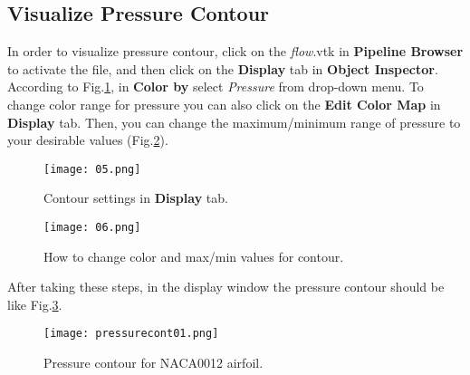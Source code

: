 \subsection{Visualize Pressure Contour}
In order to visualize pressure contour, click on the \textit{flow}.vtk in \textbf{Pipeline Browser} to activate the file, and then click on the \textbf{Display} tab in \textbf{Object Inspector}. According to Fig.\ref{fig:colorby}, in \textbf{Color by} select \textit{Pressure} from drop-down menu. To change color range for pressure you can also click on the \textbf{Edit Color Map} in \textbf{Display} tab. Then, you can change the maximum/minimum range of pressure to your desirable values (Fig.\ref{fig:change_color_range}).
\begin{figure}[htbp]
    \centering
    \texttt{[image: 05.png]}
    \caption{Contour settings in \textbf{Display} tab.}
    \label{fig:colorby}
\end{figure}
\begin{figure}[htbp]
    \centering
    \texttt{[image: 06.png]}
    \caption{How to change color and max/min values for contour.}
    \label{fig:change_color_range}
\end{figure}
After taking these steps, in the display window the pressure contour should be like Fig.\ref{fig:pressure_contour}.
\begin{figure}[htbp]
    \centering
    \texttt{[image: pressurecont01.png]}
    \caption{Pressure contour for NACA0012 airfoil.}
    \label{fig:pressure_contour}
\end{figure}

